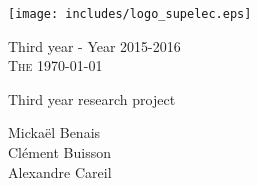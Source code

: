 \makeatletter
\begin{minipage}{1\textwidth}
  \centering 

  \begin{flushleft}
    \texttt{[image: includes/logo\_supelec.eps]}
    \newline

    Third year - Year 2015-2016 \\
    \textsc{The \today}
  \end{flushleft}
  
  \vskip 6cm
  {\LARGE\textsc \@title}
  \vskip 0.5cm
  {\LARGE\textsc Third year research project}
  \vskip 6cm

  \Large{ Mickaël Benais\\
    Clément Buisson\\
    Alexandre Careil
}
\end{minipage}
\thispagestyle{empty}
\makeatother